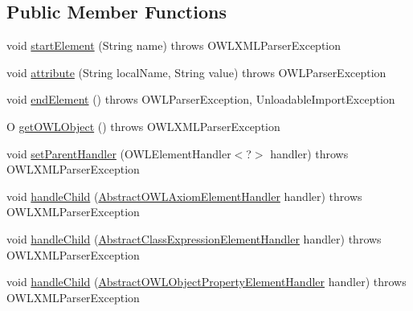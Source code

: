 \subsection*{Public Member Functions}
\begin{DoxyCompactItemize}
\item 
void \hyperlink{interfaceorg_1_1coode_1_1owlapi_1_1owlxmlparser_1_1_o_w_l_element_handler_3_01_o_01_4_a445b77538001dd455d3edfdd3c74b84a}{start\-Element} (String name)  throws O\-W\-L\-X\-M\-L\-Parser\-Exception
\item 
void \hyperlink{interfaceorg_1_1coode_1_1owlapi_1_1owlxmlparser_1_1_o_w_l_element_handler_3_01_o_01_4_abdf5480c1f0fce6548c2529fe24200ba}{attribute} (String local\-Name, String value)  throws O\-W\-L\-Parser\-Exception
\item 
void \hyperlink{interfaceorg_1_1coode_1_1owlapi_1_1owlxmlparser_1_1_o_w_l_element_handler_3_01_o_01_4_a9b2215431ab117aaeaa19d64863a28f7}{end\-Element} ()  throws O\-W\-L\-Parser\-Exception, Unloadable\-Import\-Exception
\item 
O \hyperlink{interfaceorg_1_1coode_1_1owlapi_1_1owlxmlparser_1_1_o_w_l_element_handler_3_01_o_01_4_a1f7a9696a4a17569a083759e8a709be4}{get\-O\-W\-L\-Object} ()  throws O\-W\-L\-X\-M\-L\-Parser\-Exception
\item 
void \hyperlink{interfaceorg_1_1coode_1_1owlapi_1_1owlxmlparser_1_1_o_w_l_element_handler_3_01_o_01_4_a4c9fd269db83cb66c0ef73cc4c3aa5be}{set\-Parent\-Handler} (O\-W\-L\-Element\-Handler$<$?$>$ handler)  throws O\-W\-L\-X\-M\-L\-Parser\-Exception
\item 
void \hyperlink{interfaceorg_1_1coode_1_1owlapi_1_1owlxmlparser_1_1_o_w_l_element_handler_3_01_o_01_4_a8e3b58915cf19ff04334d8b5c24c6d45}{handle\-Child} (\hyperlink{classorg_1_1coode_1_1owlapi_1_1owlxmlparser_1_1_abstract_o_w_l_axiom_element_handler}{Abstract\-O\-W\-L\-Axiom\-Element\-Handler} handler)  throws O\-W\-L\-X\-M\-L\-Parser\-Exception
\item 
void \hyperlink{interfaceorg_1_1coode_1_1owlapi_1_1owlxmlparser_1_1_o_w_l_element_handler_3_01_o_01_4_aab2e9b0f09a72dbce417ef1a9d452e2d}{handle\-Child} (\hyperlink{classorg_1_1coode_1_1owlapi_1_1owlxmlparser_1_1_abstract_class_expression_element_handler}{Abstract\-Class\-Expression\-Element\-Handler} handler)  throws O\-W\-L\-X\-M\-L\-Parser\-Exception
\item 
void \hyperlink{interfaceorg_1_1coode_1_1owlapi_1_1owlxmlparser_1_1_o_w_l_element_handler_3_01_o_01_4_acab8d17842ce7570c45790b5370e31bc}{handle\-Child} (\hyperlink{classorg_1_1coode_1_1owlapi_1_1owlxmlparser_1_1_abstract_o_w_l_object_property_element_handler}{Abstract\-O\-W\-L\-Object\-Property\-Element\-Handler} handler)  throws O\-W\-L\-X\-M\-L\-Parser\-Exception

\end{DoxyCompactItemize}
